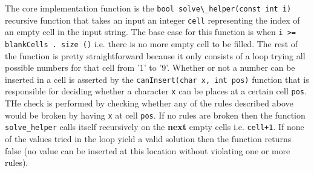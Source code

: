 The core implementation function is the \lstinline[columns=fixed]{bool
solve\_helper(const int i)} recursive function that takes an input an integer
\lstinline[columns=fixed]{cell} representing the index of an empty cell in the
input string. The base case for this function is when
\lstinline[columns=fixed]{i >= blankCells . size ()} i.e. there is no more empty
cell to be filled. The rest of the function is pretty straightforward because it
only consists of a loop trying all possible numbers for that cell from '1' to
'9'. Whether or not a number can be inserted in a cell is asserted  by the
\lstinline[columns=fixed]{canInsert(char x, int pos)} function that is
responsible for deciding whether a character \lstinline[columns=fixed]{x} can be places at a certain
cell \lstinline[columns=fixed]{pos}. THe check is performed by checking whether
any of the rules described above would be broken by having
\lstinline[columns=fixed]{x} at cell \lstinline[columns=fixed]{pos}. If no rules
are broken then the function \lstinline[columns=fixed]{solve_helper} calls
itself recursively on the \textbf{next} empty cells i.e.
\lstinline[columns=fixed]{cell+1}. If none of the values tried in the loop yield
a valid solution then the function returns false (no value can be inserted at
this location without violating one or more rules).

